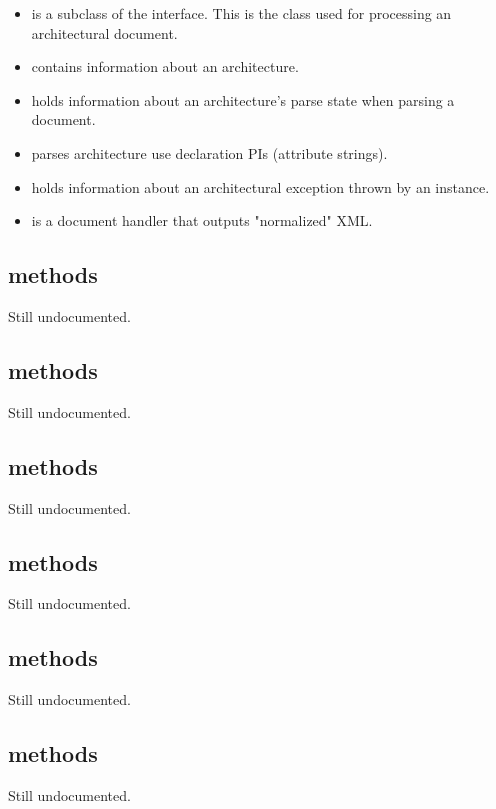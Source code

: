 \documentclass{howto}
\begin{document}
\begin{itemize}
     \item {} is a subclass of the 
       interface. This is the class used for processing an architectural
       document.

     \item {} contains information about an architecture.

     \item {} holds information about an architecture's parse
       state when parsing a document.

     \item {} parses architecture use declaration PIs (attribute
       strings).

     \item {} holds information about an architectural exception
       thrown by an  instance.

     \item {} is a document handler that outputs "normalized" XML.
\end{itemize}

\subsection{ methods}
Still undocumented.
\subsection{ methods}
Still undocumented.
\subsection{ methods}
Still undocumented.
\subsection{ methods}
Still undocumented.
\subsection{ methods}
Still undocumented.
\subsection{ methods}
Still undocumented.
       
\end{document}
